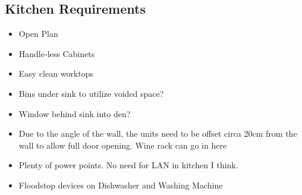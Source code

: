 \subsection{Kitchen Requirements}
\begin{itemize}
\item Open Plan
\item Handle-less Cabinets
\item Easy clean worktops
\item Bins under sink to utilize voided space?
\item Window behind sink into den?
\item Due to the angle of the wall, the units need to be offset circa 20cm from the wall to allow full door opening. Wine rack can go in here
\item Plenty of power points. No need for LAN in kitchen I think.    
\item Floodstop devices on Dishwasher and Washing Machine 
\end{itemize}

